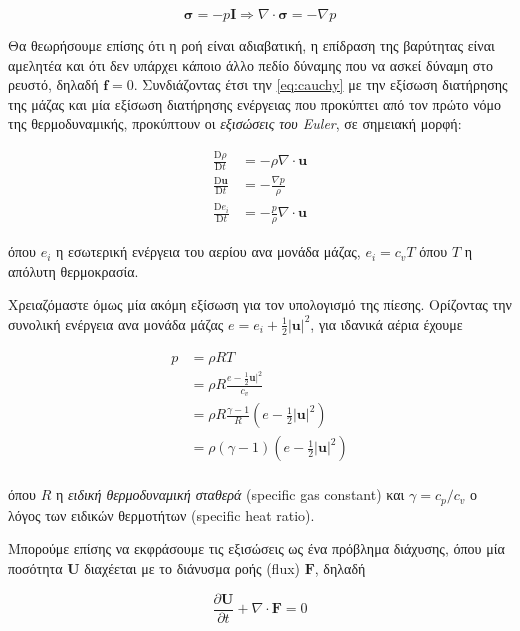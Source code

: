 \begin{equation*}
    \mathbf{\sigma} = -p\mathbf{I} \Rightarrow \nabla \cdot \mathbf{\sigma} = -\nabla p
\end{equation*}

Θα θεωρήσουμε επίσης ότι η ροή είναι αδιαβατική, η επίδραση της βαρύτητας είναι αμελητέα και ότι δεν υπάρχει κάποιο άλλο πεδίο δύναμης που να ασκεί δύναμη στο ρευστό, δηλαδή $\mathbf{f} = 0$.
Συνδιάζοντας έτσι την \eqref{eq:cauchy} με την εξίσωση διατήρησης της μάζας και μία εξίσωση διατήρησης ενέργειας που προκύπτει από τον πρώτο νόμο της θερμοδυναμικής, προκύπτουν οι \emph{εξισώσεις του Euler}, σε σημειακή μορφή:

\begin{align}\label{eq:euler}
    \frac{\mathrm{D}\rho}{\mathrm{D}t} &= -\rho \nabla \cdot \mathbf{u} \\
    \frac{\mathrm{D} \mathbf{u}}{\mathrm{D}t} &= -\frac{\nabla p}{\rho} \\
    \frac{\mathrm{D} e_i}{\mathrm{D}t} &= -\frac{p}{\rho} \nabla \cdot \mathbf{u}
\end{align}

όπου $e_i$ η εσωτερική ενέργεια του αερίου ανα μονάδα μάζας, $e_i = c_v T$ όπου $T$ η απόλυτη θερμοκρασία.

Χρειαζόμαστε όμως μία ακόμη εξίσωση για τον υπολογισμό της πίεσης.
Ορίζοντας την συνολική ενέργεια ανα μονάδα μάζας $e = e_i + \frac{1}{2} |\mathbf{u}|^2$, για ιδανικά αέρια έχουμε

\begin{align*}
    p &= \rho R T \\
      &= \rho R \frac{e - \frac{1}{2} \mathbf{u}|^2}{c_v} \\
      &= \rho R \frac{\gamma - 1}{R} \left( e - \frac{1}{2} |\mathbf{u}|^2 \right) \\
      &= \rho \left(\gamma - 1\right) \left( e - \frac{1}{2} |\mathbf{u}|^2 \right) \\
\end{align*}

όπου $R$ η \emph{ειδική θερμοδυναμική σταθερά} (specific gas constant) και $\gamma = c_p / c_v$ ο λόγος των ειδικών θερμοτήτων (specific heat ratio).

Μπορούμε επίσης να εκφράσουμε τις εξισώσεις ως ένα πρόβλημα διάχυσης, όπου μία ποσότητα $\mathbf{U}$ διαχέεται με το διάνυσμα ροής (flux) $\mathbf{F}$, δηλαδή

\begin{equation*}
    \frac{\partial \mathbf{U}}{\partial t} + \nabla \cdot \mathbf{F} = 0
\end{equation*}

